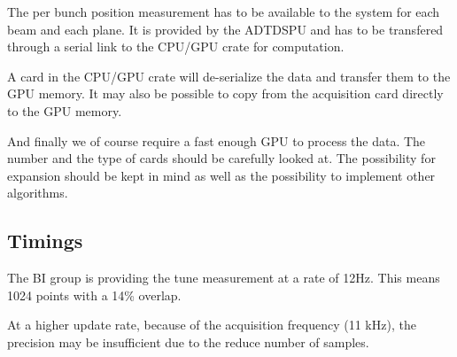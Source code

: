 The per bunch position measurement has to be available to the system for each beam and each plane. It is provided by the \gls{ADTDSPU} and has to be transfered through a serial link to the CPU/GPU crate for computation.

A card in the CPU/GPU crate will de-serialize the data and transfer them to the GPU memory. It may also be possible to copy from the acquisition card directly to the GPU memory.

And finally we of course require a fast enough GPU to process the data. The number and the type of cards should be carefully looked at. The possibility for expansion should be kept in mind as well as the possibility to implement other algorithms.

\subsection{Timings}

The \gls{BI} group is providing the tune measurement at a rate of 12Hz. This means 1024 points with a 14\% overlap. 

At a higher update rate, because of the acquisition frequency (11 kHz), the precision may be insufficient due to the reduce number of samples.
